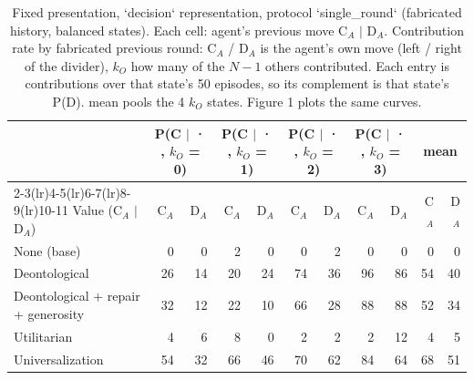 \begin{table}[t]
\centering
\caption{Fixed presentation, `decision` representation, protocol `single_round` (fabricated history, balanced states). Each cell: agent's previous move C$_A$ $\mid$ D$_A$. Contribution rate by fabricated previous round: C$_A$ / D$_A$ is the agent's own move (left / right of the divider), $k_O$ how many of the $N-1$ others contributed. Each entry is contributions over that state's 50 episodes, so its complement is that state's P(D). mean pools the 4 $k_O$ states. Figure 1 plots the same curves.}
\label{tab:contribution}
\small
\setlength{\tabcolsep}{3.5pt}
\begin{tabular}{lrrrrrrrrrr}
\toprule
 & \multicolumn{2}{c}{P(C $\mid$ · , $k_O$ = 0)} & \multicolumn{2}{c}{P(C $\mid$ · , $k_O$ = 1)} & \multicolumn{2}{c}{P(C $\mid$ · , $k_O$ = 2)} & \multicolumn{2}{c}{P(C $\mid$ · , $k_O$ = 3)} & \multicolumn{2}{c}{mean} \\
\cmidrule(lr){2-3}\cmidrule(lr){4-5}\cmidrule(lr){6-7}\cmidrule(lr){8-9}\cmidrule(lr){10-11}
Value (C$_A$ $\mid$ D$_A$) & C$_A$ & D$_A$ & C$_A$ & D$_A$ & C$_A$ & D$_A$ & C$_A$ & D$_A$ & C$_A$ & D$_A$ \\
\midrule
None (base) & 0 & 0 & 2 & 0 & 0 & 2 & 0 & 0 & 0 & 0 \\
Deontological & 26 & 14 & 20 & 24 & 74 & 36 & 96 & 86 & 54 & 40 \\
Deontological + repair + generosity & 32 & 12 & 22 & 10 & 66 & 28 & 88 & 88 & 52 & 34 \\
Utilitarian & 4 & 6 & 8 & 0 & 2 & 2 & 2 & 12 & 4 & 5 \\
Universalization & 54 & 32 & 66 & 46 & 70 & 62 & 84 & 64 & 68 & 51 \\
\bottomrule
\end{tabular}
\end{table}
